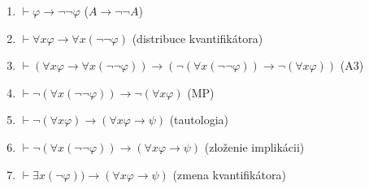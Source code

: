 \begin{enumerate}[1)]
  \item $\vdash \varphi \rightarrow \neg \neg \varphi$ ($A \rightarrow \neg \neg A$)
  \item $\vdash \forall x \varphi \rightarrow \forall x (\neg  \neg \varphi)$ (distribuce
          kvantifikátora)
  \item $\vdash (\forall x \varphi \rightarrow \forall x (\neg  \neg \varphi)) \rightarrow (\neg (\forall
          x (\neg  \neg \varphi)) \rightarrow \neg (\forall x \varphi))$ (A3)

  \item $\vdash \neg (\forall x (\neg  \neg \varphi)) \rightarrow \neg (\forall x \varphi)$ (MP)
  \item $\vdash \neg (\forall x \varphi) \rightarrow (\forall x \varphi \rightarrow \psi)$
    (tautologia)

  \item $\vdash \neg (\forall x (\neg  \neg \varphi)) \rightarrow (\forall x \varphi \rightarrow
          \psi)$ (zloženie implikácii)

  \item $\vdash \exists x (\neg \varphi)) \rightarrow (\forall x \varphi \rightarrow
          \psi)$ (zmena kvantifikátora)
\end{enumerate}
